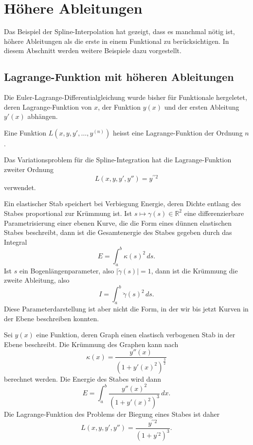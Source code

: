 %
%
%
\section{Höhere Ableitungen
\label{buch:variation:section:hoehereableitungen}}
Das Beispiel der Spline-Interpolation hat gezeigt, dass es manchmal
nötig ist, höhere Ableitungen als die erste in einem Funktional
zu berücksichtigen.
In diesem Abschnitt werden weitere Beispiele dazu vorgestellt.

%
%
\subsection{Lagrange-Funktion mit höheren Ableitungen}
Die Euler-Lagrange-Differentialgleichung wurde bisher für Funktionale
hergeletet, deren Lagrange-Funktion von $x$, der Funktion $y(x)$ und
der ersten Ableitung $y'(x)$ abhängen.

\begin{definition}
Eine Funktion $L(x,y,y',\dots,y^{(n)})$ heisst eine Lagrange-Funktion
der Ordnung $n$.
%
\end{definition}

\begin{beispiel}
Das Variationsproblem für die Spline-Integration hat die Lagrange-Funktion
zweiter Ordnung
\[
L(x,y,y',y'') = y^{\prime\prime 2}
\]
verwendet.
\end{beispiel}

Ein elastischer Stab speichert bei Verbiegung Energie, deren Dichte
entlang des Stabes proportional zur Krümmung ist.
Ist $s\mapsto \gamma(s)\in\mathbb{R}^2$ eine differenzierbare
Parametrisierung einer ebenen Kurve, die die Form eines dünnen elastischen
Stabes beschreibt, dann ist die Gesamtenergie des Stabes gegeben durch
das Integral
\[
E
=
\int_a^b \kappa(s)^2 \,ds.
\]
Ist $s$ ein Bogenlängenparameter, also $|\dot{\gamma}(s)|=1$, dann ist
die Krümmung die zweite Ableitung, also
\[
I = \int_a^b \ddot{\gamma}(s)^2\,ds.
\]
Diese Parameterdarstellung ist aber nicht die Form, in der wir bis jetzt
Kurven in der Ebene beschreiben konnten.

Sei $y(x)$ eine Funktion, deren Graph einen elastisch verbogenen Stab
in der Ebene beschreibt.
Die Krümmung des Graphen kann nach
\[
\kappa(x)
=
\frac{y''(x)}{(1+y'(x)^2)^{\frac32}}
\]
berechnet werden.
Die Energie des Stabes wird dann
\[
E
=
\int_a^b \frac{y''(x)^2}{(1+y'(x)^2)^3}\,dx.
\]
Die Lagrange-Funktion des Problems der Biegung eines Stabes ist daher
\[
L(x,y,y',y'')
=
\frac{y^{\prime\prime 2}}{(1+y^{\prime 2})^3}.
\]

